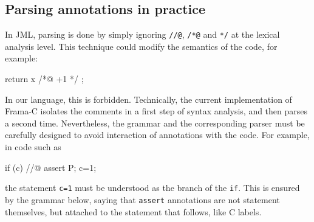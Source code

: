 \subsection{Parsing annotations in practice}

In JML, parsing is done by simply ignoring \verb|//@|, \verb|/*@| and
\verb|*/| at the lexical analysis level. This technique could modify the
semantics of the code, for example: 
\begin{c}
return x /*@ +1 */ ;
\end{c}
In our language, this is forbidden. Technically, the current
implementation of Frama-C isolates the comments in a first step of
syntax analysis, and then parses a second time. Nevertheless, the
grammar and the corresponding parser must be carefully designed to
avoid interaction of annotations with the code. For example, in code such as
\begin{c}
  if (c) //@ assert P;
     c=1;
\end{c}
the statement \verb|c=1| must be understood as the 
branch of the \texttt{if}. This is ensured by the grammar below,
saying that \verb|assert| annotations are not statement themselves,
but attached to the statement that follows, like C labels.
